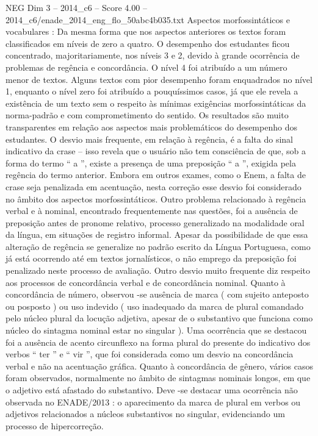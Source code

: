 \begin{textsample}{NEG Dim 3 – 2014\_c6 – Score 4.00 – 2014\_c6/enade\_2014\_eng\_flo\_50abc4b035.txt}
Aspectos morfossintáticos e vocabulares : Da mesma forma que nos aspectos anteriores os textos foram classificados em níveis de zero a quatro.
O desempenho dos estudantes ficou concentrado, majoritariamente, nos níveis 3 e 2, devido à grande ocorrência de problemas de regência e concordância.
O nível 4 foi atribuído a um número menor de textos.
Alguns textos com pior desempenho foram enquadrados no nível 1, enquanto o nível zero foi atribuído a pouquíssimos casos, já que ele revela a existência de um texto sem o respeito às mínimas exigências morfossintáticas da norma-padrão e com comprometimento do sentido.
Os resultados são muito transparentes em relação aos aspectos mais problemáticos do desempenho dos estudantes.
O desvio mais frequente, em relação à regência, é a falta do sinal indicativo da crase – isso revela que o usuário não tem consciência de que, sob a forma do termo “ a ”, existe a presença de uma preposição “ a ”, exigida pela regência do termo anterior.
Embora em outros exames, como o Enem, a falta de crase seja penalizada em acentuação, nesta correção esse desvio foi considerado no âmbito dos aspectos morfossintáticos.
Outro problema relacionado à regência verbal e à nominal, encontrado frequentemente nas questões, foi a ausência de preposição antes de pronome relativo, processo generalizado na modalidade oral da língua, em situações de registro informal.
Apesar da possibilidade de que essa alteração de regência se generalize no padrão escrito da Língua Portuguesa, como já está ocorrendo até em textos jornalísticos, o não emprego da preposição foi penalizado neste processo de avaliação.
Outro desvio muito frequente diz respeito aos processos de concordância verbal e de concordância nominal.
Quanto à concordância de número, observou -se ausência de marca ( com sujeito anteposto ou posposto ) ou uso indevido ( uso inadequado da marca de plural comandado pelo núcleo plural da locução adjetiva, apesar de o substantivo que funciona como núcleo do sintagma nominal estar no singular ).
Uma ocorrência que se destacou foi a ausência de acento circunflexo na forma plural do presente do indicativo dos verbos “ ter ” e “ vir ”, que foi considerada como um desvio na concordância verbal e não na acentuação gráfica.
Quanto à concordância de gênero, vários casos foram observados, normalmente no âmbito de sintagmas nominais longos, em que o adjetivo está afastado do substantivo.
Deve -se destacar uma ocorrência não observada no ENADE/2013 : o aparecimento da marca de plural em verbos ou adjetivos relacionados a núcleos substantivos no singular, evidenciando um processo de hipercorreção.

\end{textsample}
